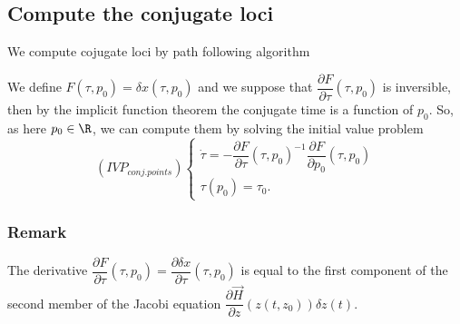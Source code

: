 \documentclass[11pt]{article}
\begin{document}
    \hypertarget{compute-the-conjugate-loci}{%
\subsection{Compute the conjugate
loci}\label{compute-the-conjugate-loci}}

We compute cojugate loci by path following algorithm

We define \(F(\tau,p_0) = \delta x(\tau,p_0)\) and we suppose that
\(\dfrac{\partial F}{\partial\tau}(\tau,p_0)\) is inversible, then by
the implicit function theorem the conjugate time is a function of
\(p_0\). So, as here \(p_0\in\R\), we can compute them by solving the
initial value problem \[(IVP_{conj.points})\left\{
\begin{array}{l}
\dot{\tau} = -\dfrac{\partial F}{\partial\tau}(\tau,p_0)^{-1}\dfrac{\partial F}{\partial p_0}(\tau,p_0)\\
\tau(p_0) = \tau_0.
\end{array}
    \right.\]

\hypertarget{remark}{%
\subsubsection{Remark}\label{remark}}

The derivative
\(\dfrac{\partial F}{\partial\tau}(\tau,p_0) = \dfrac{\partial \delta x}{\partial\tau}(\tau,p_0)\)
is equal to the first component of the second member of the Jacobi
equation \(\dfrac{\partial \vec{H}}{\partial z}(z(t,z_0))\delta z(t)\).
\end{document}
